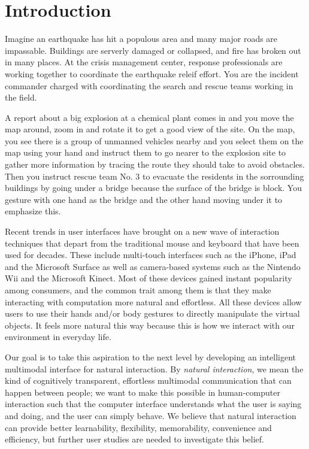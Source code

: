 \section{Introduction}
Imagine an earthquake has hit a populous area and many major roads are
impassable. Buildings are serverly damaged or collapsed, and fire has broken out
in many places. At the crisis management center, response professionals are
working together to coordinate the earthquake releif effort. You are the
incident commander charged with coordinating the search
and rescue teams working in the field.

A report about a big explosion at a chemical plant comes in and you move the map
around, zoom in and rotate it to get a good view of the site. On the map, you
see there is a group of unmanned vehicles nearby and you select them on
the map using your hand and instruct them to go nearer to the explosion site to
gather more information by tracing the route they should take to avoid obstacles. 
Then you instruct rescue team No. 3 to evacuate the residents
in the sorrounding buildings by going under a bridge because the surface of the
bridge is block. You gesture with one hand as the bridge and the other
hand moving under it to emphasize this.

Recent trends in user
interfaces have brought on a new wave of interaction techniques that depart from the traditional mouse and keyboard that have been used for decades. These include multi-touch interfaces such as the iPhone\textsuperscript{\textregistered}, iPad and the Microsoft Surface\textsuperscript{\textregistered} as well as camera-based systems such as
the Nintendo\textsuperscript{\textregistered} Wii and the Microsoft Kinect. Most
of these devices gained instant popularity among consumers, and the common trait
among them is that they make interacting with computation more natural and
effortless. All these devices allow users to use their hands and/or body
gestures to directly manipulate the virtual objects. It feels more natural this
way because this is how we interact with our environment in everyday
life.
 
Our goal is to take this aspiration to the next level by developing an
intelligent multimodal interface for natural interaction. By \textit{natural
interaction}, we mean the kind of cognitively transparent, effortless multimodal
communication that can happen between people; we want to make this possible in
human-computer interaction such that the computer interface understands what the
user is saying and doing, and the user can simply behave. We believe that
natural interaction can provide better learnability, flexibility, memorability,
convenience and efficiency, but further user studies are needed to investigate
this belief.

